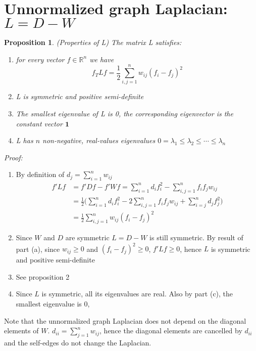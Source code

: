 \documentclass[10pt,a4paper, nocenter]{report}
\newtheorem{prop}{Proposition}
\begin{document}
		\section{Unnormalized graph Laplacian: $L=D-W$}
			\begin{prop}(Properties of L) The matrix L satisfies:
				\begin{enumerate}
					\item for every vector $f \in \mathbb{R}^{n}$ we have $$ f_{T}Lf = \frac{1}{2}\sum_{i,j=1}^{n} w_{ij}(f_{i}-f_{j})^{2} $$
					\item L is symmetric and positive semi-definite
					\item The smallest eigenvalue of L is 0, the corresponding eigenvector is the constant vector $\mathbf{1}$
					\item L has $n$ non-negative, real-values eigenvalues $0=\lambda_{1} \le \lambda_{2} \le \cdots \le \lambda_{n}$
				\end{enumerate}
			\end{prop}
			\textit{Proof:}
			\begin{enumerate}
				\item  By definition of $d_{j} = \sum_{i=1}^{n}w_{ij}$
				\begin{align*}
				f'Lf & = f'Df - f'Wf = \sum_{i=1}^{n}d_{i}f_{i}^{2} -  \sum_{i,j=1}^{n}f_{i}f_{j}w_{ij}\\
				& = \frac{1}{2}\bigg(\sum_{i=1}^{n}d_{i}f_{i}^{2} -  2\sum_{i,j=1}^{n}f_{i}f_{j}w_{ij} + \sum_{i=j}^{n}d_{j}f_{j}^{2}\bigg)\\
				& = \frac{1}{2}\sum_{i,j=1}^{n}w_{ij}(f_{i}-f_{j})^{2}
				\end{align*}
				\item Since $W$ and $D$ are symmetric $L = D-W$ is still symmetric. By result of part (a), since $w_{ij} \ge 0$ and $(f_{i}-f_{j})^{2} \ge 0$, $f'Lf \ge 0$, hence $L$ is symmetric and positive semi-definite
				\item See proposition 2
				\item Since $L$ is symmetric, all its eigenvalues are real. Also by part (c), the smallest eigenvalue is 0, 
			\end{enumerate}
		
			Note that the unnormalized graph Laplacian does not depend on the diagonal elements of $W$. $d_{ii} = \sum_{j=1}^{n}w_{ij}$, hence the diagonal elements are cancelled by $d_{ii}$ and the self-edges do not change the Laplacian. \\
			
\end{document}
